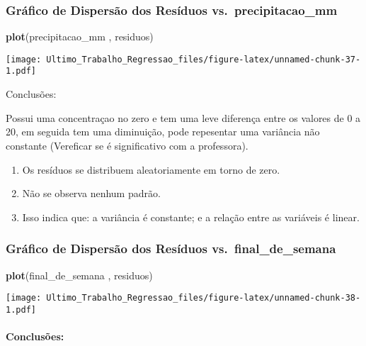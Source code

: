 \documentclass[
]{article}
\newenvironment{Shaded}{\begin{snugshade}}{\end{snugshade}}
\newcommand{\FunctionTok}[1]{\textcolor[rgb]{0.13,0.29,0.53}{\textbf{#1}}}
\newcommand{\NormalTok}[1]{#1}
\providecommand{\tightlist}{%
  \setlength{\itemsep}{0pt}\setlength{\parskip}{0pt}}
\begin{document}
\hypertarget{gruxe1fico-de-dispersuxe3o-dos-resuxedduos-vs.-precipitacao_mm}{%
\subsubsection{Gráfico de Dispersão dos Resíduos
vs.~precipitacao\_mm}\label{gruxe1fico-de-dispersuxe3o-dos-resuxedduos-vs.-precipitacao_mm}}

\begin{Shaded}
\begin{Highlighting}[]
\FunctionTok{plot}\NormalTok{(precipitacao\_mm , residuos)}
\end{Highlighting}
\end{Shaded}

\texttt{[image: Ultimo\_Trabalho\_Regressao\_files/figure-latex/unnamed-chunk-37-1.pdf]}

Conclusões:

Possui uma concentraçao no zero e tem uma leve diferença entre os
valores de 0 a 20, em seguida tem uma diminuição, pode repesentar uma
variância não constante (Vereficar se é significativo com a professora).

\begin{enumerate}
\def\labelenumi{\arabic{enumi}.}
\tightlist
\item
  Os resíduos se distribuem aleatoriamente em torno de zero.
\item
  Não se observa nenhum padrão.
\item
  Isso indica que: a variância é constante; e a relação entre as
  variáveis é linear.
\end{enumerate}

\hypertarget{gruxe1fico-de-dispersuxe3o-dos-resuxedduos-vs.-final_de_semana}{%
\subsubsection{Gráfico de Dispersão dos Resíduos
vs.~final\_de\_semana}\label{gruxe1fico-de-dispersuxe3o-dos-resuxedduos-vs.-final_de_semana}}

\begin{Shaded}
\begin{Highlighting}[]
\FunctionTok{plot}\NormalTok{(final\_de\_semana , residuos)}
\end{Highlighting}
\end{Shaded}

\texttt{[image: Ultimo\_Trabalho\_Regressao\_files/figure-latex/unnamed-chunk-38-1.pdf]}

\hypertarget{conclusuxf5es-3}{%
\paragraph{Conclusões:}\label{conclusuxf5es-3}}
\end{document}
